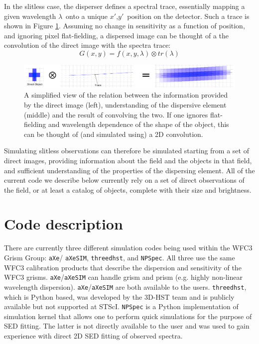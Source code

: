 \documentclass[preprint]{aastex}
\begin{document}
In the slitless case, the disperser defines a spectral trace, essentially mapping a given wavelength $\lambda$\ onto a unique $x'$,$y'$\ position on the detector. Such a trace is shown in Figure \ref{fig:1}. Assuming no change in sensitivity as a function of position, and ignoring pixel flat-fielding, a dispersed image can be thought of a the convolution of the direct image with the spectra trace:
\begin{dmath}
G(x,y) =  f(x,y,\lambda) \otimes tr(\lambda)
\end{dmath}

\begin{figure}[!ht]
\centering
\includegraphics[width=7.in]{"Figures/Grism_Equation"}
\caption{A simplified view of the relation between the information provided by the direct image (left), understanding of the dispersive element (middle) and the result of convolving the two. If one ignores flat-fielding and wavelength dependence of the shape of the object, this can be thought of (and simulated using) a 2D convolution.}
\label{fig:1}
\end{figure}

Simulating slitless observations can therefore be simulated starting from a set of direct images, providing information about the field and the objects in that field, and sufficient understanding of the properties of the dispersing element.
All of the current code we describe below currently rely on a set of direct observations of the field, or at least a catalog of objects, complete with their size and brightness. 


\section{Code description}

There are currently three different simulation codes being used within the WFC3 Grism Group:  \texttt{aXe}/ \texttt{aXeSIM}, \texttt{threedhst}, and \texttt{NPSpec}. All three use the same WFC3 calibration products that describe the dispersion and sensitivity of the WFC3 grisms. \texttt{aXe}/\texttt{aXeSIM} can handle grism and prism (e.g. highly non-linear wavelength dispersion). \texttt{aXe}/\texttt{aXeSIM} are both available to the users. \texttt{threedhst}, which is Python based, was developed by the 3D-HST team and is publicly available but not supported at STScI. \texttt{NPSpec} is a Python implementation of simulation kernel that allows one to perform quick simulations for the purpose of SED fitting. The latter is not directly available to the user and was used to gain experience with direct 2D SED fitting of observed spectra.
\end{document}
